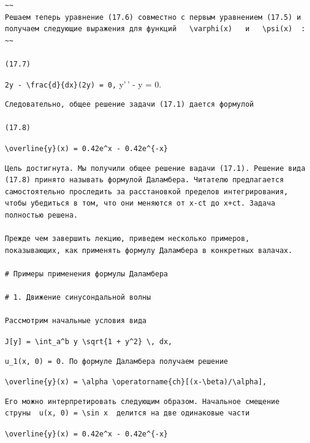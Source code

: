\documentclass[
  ukrainian,
]{article}
\begin{document}
\begin{verbatim}
~~
Решаем теперь уравнение (17.6) совместно с первым уравнением (17.5) и получаем следующие выражения для функций   \varphi(x)   и   \psi(x)  :
~~

(17.7)
\end{verbatim}

\texttt{2y\ -\ \textbackslash{}frac\{d\}\{dx\}(2y\textquotesingle{})\ =\ 0,}
y'\,' - y = 0.

\begin{verbatim}
Следовательно, общее решение задачи (17.1) дается формулой

(17.8)
\end{verbatim}

\texttt{\textbackslash{}overline\{y\}(x)\ =\ 0.42e\^{}x\ -\ 0.42e\^{}\{-x\}}

\begin{verbatim}
Цель достигнута. Мы получили общее решение вадачи (17.1). Решение вида (17.8) принято называть формулой Даламбера. Читателю предлагается самостоятельно проследить за расстановкой пределов интегрирования, чтобы убедиться в том, что они меняются от x-ct до x+ct. Задача полностью решена.

Прежде чем завершить лекцию, приведем несколько примеров, показывающих, как применять формулу Даламбера в конкретных валачах.

# Примеры применения формулы Даламбера

# 1. Движение синусондальной волны

Рассмотрим начальные условия вида
\end{verbatim}

\texttt{J{[}y{]}\ =\ \textbackslash{}int\_a\^{}b\ y\ \textbackslash{}sqrt\{1\ +\ y\textquotesingle{}\^{}2\}\ \textbackslash{},\ dx,}

\begin{verbatim}
u_1(x, 0) = 0. По формуле Даламбера получаем решение
\end{verbatim}

\texttt{\textbackslash{}overline\{y\}(x)\ =\ \textbackslash{}alpha\ \textbackslash{}operatorname\{ch\}{[}(x-\textbackslash{}beta)/\textbackslash{}alpha{]},}

\begin{verbatim}
Его можно интерпретировать следующим образом. Начальное смещение струны  u(x, 0) = \sin x  делится на две одинаковые части
\end{verbatim}

\texttt{\textbackslash{}overline\{y\}(x)\ =\ 0.42e\^{}x\ -\ 0.42e\^{}\{-x\}}
\end{document}
